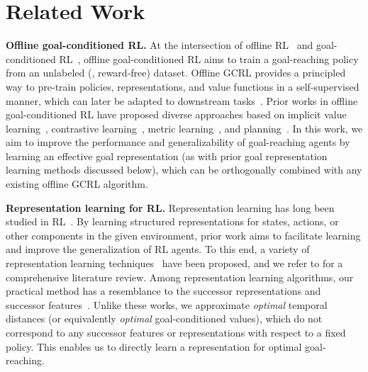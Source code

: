 \documentclass[final]{article} %
\theoremstyle{plain}
\theoremstyle{definition}
\theoremstyle{remark}
\newcommand{\cutsectionup}{\vspace{-2pt}}
\newcommand{\cutsectiondown}{\vspace{-3pt}}
\begin{document}
\cutsectionup
\section{Related Work}
\cutsectiondown
\label{sec:related}

\textbf{Offline goal-conditioned RL.}
At the intersection of offline RL~\citep{batch_lange2012, offline_levine2020} and goal-conditioned RL~\citep{gcrl_kaelbling1993},
offline goal-conditioned RL aims to train a goal-reaching policy from an unlabeled (\ie, reward-free) dataset.
Offline GCRL provides a principled way to pre-train policies, representations, and value functions in a self-supervised manner,
which can later be adapted to downstream tasks~\citep{vip_ma2023, icvf_ghosh2023, u2o_kim2024, ogbench_park2025}.
Prior works in offline goal-conditioned RL have proposed diverse approaches based on 
implicit value learning~\citep{hiql_park2023},
contrastive learning~\citep{crl_eysenbach2022, tdinfonce_zheng2024},
metric learning~\citep{qrl_wang2023, cmd_myers2024},
and planning~\citep{sptm_savinov2018, sorb_eysenbach2019, goplan_wang2024}.
In this work, we aim to improve the performance and generalizability of goal-reaching agents
by learning an effective goal representation (as with prior goal representation learning methods discussed below),
%
which can be orthogonally combined with any existing offline GCRL algorithm.
%

\textbf{Representation learning for RL.}
%
Representation learning has long been studied in RL~\citep{rep_echchahed2025}.
By learning structured representations for states, actions, or other components in the given environment,
prior work aims to facilitate learning and improve the generalization of RL agents.
%
%
%
%
To this end, a variety of representation learning techniques~\citep{bisim_li2006, bisim_castro2019, lap_wu2019, curl_laskin2020, spr_schwarzer2021} have been proposed,
and we refer to \citet{rep_echchahed2025} for a comprehensive literature review.
Among representation learning algorithms,
our practical method has a resemblance to
the successor representations and successor features~\citep{sr_dayan1993, sf_barreto2017, fb_touati2021, zs_touati2023}.
Unlike these works, we approximate \emph{optimal} temporal distances (or equivalently \emph{optimal} goal-conditioned values),
which do not correspond to any successor features or representations with respect to a fixed policy.
This enables us to directly learn a representation for optimal goal-reaching.
\end{document}
